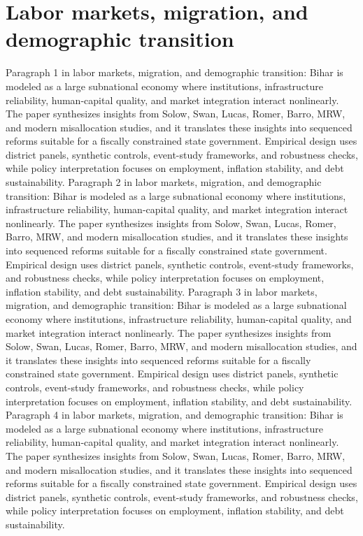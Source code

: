 \documentclass[preprint,12pt]{elsarticle}
\begin{document}
\section{Labor markets, migration, and demographic transition}
Paragraph 1 in labor markets, migration, and demographic transition: Bihar is modeled as a large subnational economy where institutions, infrastructure reliability, human-capital quality, and market integration interact nonlinearly. The paper synthesizes insights from Solow, Swan, Lucas, Romer, Barro, MRW, and modern misallocation studies, and it translates these insights into sequenced reforms suitable for a fiscally constrained state government. Empirical design uses district panels, synthetic controls, event-study frameworks, and robustness checks, while policy interpretation focuses on employment, inflation stability, and debt sustainability.
Paragraph 2 in labor markets, migration, and demographic transition: Bihar is modeled as a large subnational economy where institutions, infrastructure reliability, human-capital quality, and market integration interact nonlinearly. The paper synthesizes insights from Solow, Swan, Lucas, Romer, Barro, MRW, and modern misallocation studies, and it translates these insights into sequenced reforms suitable for a fiscally constrained state government. Empirical design uses district panels, synthetic controls, event-study frameworks, and robustness checks, while policy interpretation focuses on employment, inflation stability, and debt sustainability.
Paragraph 3 in labor markets, migration, and demographic transition: Bihar is modeled as a large subnational economy where institutions, infrastructure reliability, human-capital quality, and market integration interact nonlinearly. The paper synthesizes insights from Solow, Swan, Lucas, Romer, Barro, MRW, and modern misallocation studies, and it translates these insights into sequenced reforms suitable for a fiscally constrained state government. Empirical design uses district panels, synthetic controls, event-study frameworks, and robustness checks, while policy interpretation focuses on employment, inflation stability, and debt sustainability.
Paragraph 4 in labor markets, migration, and demographic transition: Bihar is modeled as a large subnational economy where institutions, infrastructure reliability, human-capital quality, and market integration interact nonlinearly. The paper synthesizes insights from Solow, Swan, Lucas, Romer, Barro, MRW, and modern misallocation studies, and it translates these insights into sequenced reforms suitable for a fiscally constrained state government. Empirical design uses district panels, synthetic controls, event-study frameworks, and robustness checks, while policy interpretation focuses on employment, inflation stability, and debt sustainability.
\end{document}
